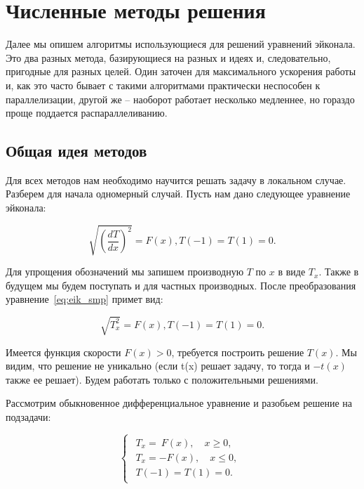 \section{Численные методы решения}
\label{sec:algrhtms}

Далее мы опишем алгоритмы использующиеся для решений уравнений
эйконала. Это два разных метода, базирующиеся на разных и идеях и,
следовательно, пригодные для разных целей. Один заточен для
максимального ускорения работы и, как это часто бывает с такими
алгоритмами практически неспособен к параллелизации, другой же --
наоборот работает несколько медленнее, но гораздо проще поддается
распараллеливанию.

\subsection{Общая идея методов}
\label{sec:general-idea}

Для всех методов нам необходимо научится решать задачу в локальном
случае. Разберем для начала одномерный случай. Пусть нам дано
следующее уравнение эйконала:

\begin{equation}
  \label{eq:eik_smp}
  \sqrt{(\frac{dT}{dx})^2}=F(x), T(-1) = T(1) = 0.
\end{equation}


Для упрощения обозначений мы запишем производную $T$ по $x$ в виде
$T_x$. Также в будущем мы будем поступать и для частных
производных. После преобразования уравнение~\eqref{eq:eik_smp} примет вид:

\begin{equation*}
  \sqrt{T_x^2}=F(x), T(-1) = T(1) = 0.
\end{equation*}


Имеется функция скорости $F(x) > 0$, требуется построить
решение $T(x)$. Мы видим, что решение не уникально (если t(x) решает
задачу, то тогда и $-t(x)$ также ее решает). Будем работать только с
положительными решениями.

Рассмотрим обыкновенное дифференциальное уравнение и разобьем решение
на подзадачи:

\begin{equation*}
  \begin{cases}
      \begin{array}{ll}
        T_x = ~F(x), \quad x \ge 0,\\
        T_x = -F(x), \quad x \le 0,\\[0.3cm]
        T(-1)= T(1) = 0.
      \end{array}
    \end{cases}
\end{equation*}

